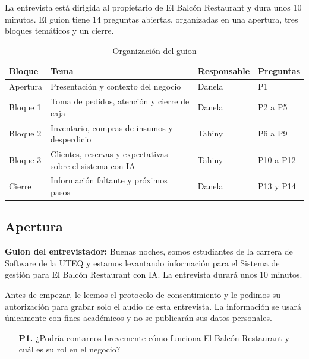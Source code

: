 La entrevista está dirigida al propietario de El Balcón Restaurant y dura unos 10 minutos. El guion tiene 14 preguntas abiertas, organizadas en una apertura, tres bloques temáticos y un cierre.

\begin{table}[H]
\centering\footnotesize
\caption{Organización del guion}\label{tab:organizacion-guion}
\begin{tabularx}{\textwidth}{@{}p{}Yp{0.13\textwidth}p{0.13\textwidth}@{}}
\toprule
\textbf{Bloque} & \textbf{Tema} & \textbf{Responsable} & \textbf{Preguntas}\\
\midrule
Apertura & Presentación y contexto del negocio & Danela & P1\\
Bloque 1 & Toma de pedidos, atención y cierre de caja & Danela & P2 a P5\\
Bloque 2 & Inventario, compras de insumos y desperdicio & Tahiny & P6 a P9\\
Bloque 3 & Clientes, reservas y expectativas sobre el sistema con IA & Tahiny & P10 a P12\\
Cierre & Información faltante y próximos pasos & Danela & P13 y P14\\
\bottomrule
\end{tabularx}
\end{table}

\subsection{Apertura}
\textbf{Guion del entrevistador:} Buenas noches, somos estudiantes de la carrera de Software de la UTEQ y estamos levantando información para el Sistema de gestión para El Balcón Restaurant con IA. La entrevista durará unos 10 minutos.

Antes de empezar, le leemos el protocolo de consentimiento y le pedimos su autorización para grabar solo el audio de esta entrevista. La información se usará únicamente con fines académicos y no se publicarán sus datos personales.

\begin{itemize}
\item[\textbf{P1.}] ¿Podría contarnos brevemente cómo funciona El Balcón Restaurant y cuál es su rol en el negocio?
\end{itemize}

